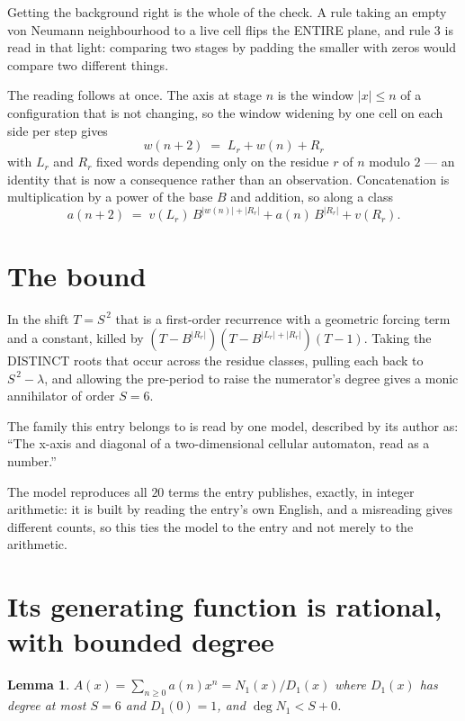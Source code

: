 \documentclass[11pt,a4paper]{article}
\theoremstyle{plain}
\newtheorem{lemma}[theorem]{Lemma}
\theoremstyle{definition}
\begin{document}
Getting the background right is the whole of the check. A rule taking an empty von Neumann
neighbourhood to a live cell flips the ENTIRE plane, and rule 3 is read
in that light: comparing two stages by padding the smaller with zeros would compare two
different things.

The reading follows at once. The axis at stage $n$ is the window $|x|\le n$ of a configuration
that is not changing, so the window widening by one cell on each side per step gives
\[
w(n+2)\;=\;L_r + w(n) + R_r
\]
with $L_r$ and $R_r$ fixed words depending only on the residue $r$ of $n$ modulo $2$ --- an
identity that is now a consequence rather than an observation. Concatenation is multiplication
by a power of the base $B$ and addition, so along a class
\[
a(n+2)\;=\;v(L_r)\,B^{|w(n)|+|R_r|} + a(n)\,B^{|R_r|} + v(R_r).
\]

\section{The bound}

In the shift $T=S^{\,2}$ that is a first-order recurrence with a geometric forcing term and a
constant, killed by $(T-B^{|R_r|})(T-B^{|L_r|+|R_r|})(T-1)$. Taking the DISTINCT roots that
occur across the residue classes, pulling each back to $S^{\,2}-\lambda$, and allowing the
pre-period to raise the numerator's degree gives a monic annihilator of order $S=6$.

The family this entry belongs to is read by one model, described by its author as: ``The x-axis and diagonal of a two-dimensional cellular automaton, read as a number.''


The model reproduces all $20$ terms the entry publishes, exactly, in integer arithmetic:
it is built by reading the entry's own English, and a misreading gives different counts, so
this ties the model to the entry and not merely to the arithmetic.

\section{Its generating function is rational, with bounded degree}

\begin{lemma}\label{lem:rat}
$A(x)=\sum_{n\ge0}a(n)x^n=N_1(x)/D_1(x)$ where $D_1(x)$ has degree at most $S=6$ and
$D_1(0)=1$, and $\deg N_1<S+0$.
\end{lemma}
\end{document}
